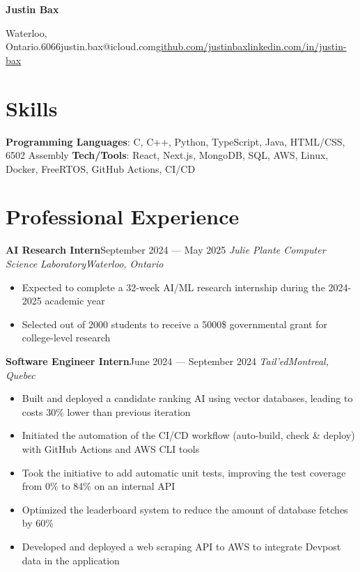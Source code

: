 \documentclass{article}
\newcommand{\cdelim}{\;\textbar\;}
\newcommand{\newrole}[4]{
    {\normalfont\textbf{#1}\hfill#3}
    \newline
    \textit{#2}\hfill\textit{#4}
}
\newenvironment{bulletpoints}{\begin{itemize}\setlength\itemsep{-0.2em}}{\end{itemize}}
\begin{document}
\begin{center}
    {\Huge\bfseries Justin Bax}\\\vspace*{2pt}

    Waterloo, Ontario\cdelim 438.763.6066\cdelim justin.bax@icloud.com\cdelim\href{https://github.com/justinbax}{github.com/justinbax}\cdelim\href{https://linkedin.com/in/justin-bax}{linkedin.com/in/justin-bax}\\
\end{center}

\section*{Skills}

{\bfseries Programming Languages}: C, C++, Python, TypeScript, Java, HTML/CSS, 6502 Assembly
\newline
{\bfseries Tech/Tools}: React, Next.js, MongoDB, SQL, AWS, Linux, Docker, FreeRTOS, GitHub Actions, CI/CD


\section*{Professional Experience}

\newrole{AI Research Intern}{Julie Plante Computer Science Laboratory}{September 2024 --- May 2025}{Waterloo, Ontario}
\begin{bulletpoints}
    \item Expected to complete a 32-week AI/ML research internship during the 2024-2025 academic year
    \item Selected out of 2000 students to receive a 5000\$ governmental grant for college-level research
\end{bulletpoints}

\newrole{Software Engineer Intern}{Tail'ed}{June 2024 --- September 2024}{Montreal, Quebec}
\begin{bulletpoints}
    \item Built and deployed a candidate ranking AI using vector databases, leading to costs 30\% lower than previous iteration
    \item Initiated the automation of the CI/CD workflow (auto-build, check \& deploy) with GitHub Actions and AWS CLI tools
    \item Took the initiative to add automatic unit tests, improving the test coverage from 0\% to 84\% on an internal API
    \item Optimized the leaderboard system to reduce the amount of database fetches by 60\%
    \item Developed and deployed a web scraping API to AWS to integrate Devpost data in the application
\end{bulletpoints}
\end{document}
